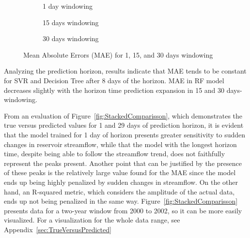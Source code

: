 \documentclass[12pt]{article}
\begin{document}
\begin{figure}[htb]
    \centering
    \begin{subfigure}[b]{.49\textwidth}
        \centering
        
        \caption{1 day windowing}
        \label{fig:sfig1MAE}
    \end{subfigure}
    \begin{subfigure}[b]{.49\textwidth}
        \centering
        
        \caption{15 days windowing}
        \label{fig:sfig2MAE}
    \end{subfigure}
    \begin{subfigure}[b]{\textwidth}
        \centering
        
        \captionsetup{justification=justified,singlelinecheck=false}
        \caption{30 days windowing}
        \label{fig:sfig3MAE}
    \end{subfigure}
    \caption{Mean Absolute Errors (MAE) for  1,  15, and  30 days windowing}
    \label{fig:sfigMAE}
\end{figure}

Analyzing the prediction horizon, results indicate that MAE tends to be constant for SVR and Decision Tree after 8 days of the horizon. MAE in RF model decreases slightly with the horizon time prediction expansion in 15 and 30 days-windowing.

From an evaluation of Figure~\ref{fig:StackedComparisson}, which demonstrates the true versus predicted values for 1 and 29 days of prediction horizon, it is evident that the model trained for 1 day of horizon presents greater sensitivity to sudden changes in reservoir streamflow, while that the model with the longest horizon time, despite being able to follow the streamflow trend, does not faithfully represent the peaks present. Another point that can be justified by the presence of these peaks is the relatively large value found for the MAE since the model ends up being highly penalized by sudden changes in streamflow. On the other hand, an R-squared metric, which considers the amplitude of the actual data, ends up not being penalized in the same way. Figure~\ref{fig:StackedComparisson} presents data for a two-year window from 2000 to 2002, so it can be more easily visualized. For a visualization for the whole data range, see Appendix~\ref{sec:TrueVersusPredicted}
\end{document}
